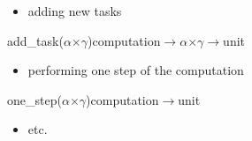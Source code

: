 \documentclass[xcolor=dvipsnames]{beamer}
\begin{document}
\begin{frame}
\medskip\noindent
  \begin{itemize}
  \item adding new tasks
  \end{itemize}
  

\medskip\noindent
{\colorbox{tmpcolor}{\begin{minipage}{\textwidth}\ttfamily\parindent 0pt

\noindent{}\hspace*{1.22ex}add\_{}task\hspace*{1.22ex}(\ensuremath{\alpha}\hspace*{1.22ex}\ensuremath{\times}\hspace*{1.22ex}\ensuremath{\gamma})\hspace*{1.22ex}computation\hspace*{1.22ex}\ensuremath{\rightarrow}\hspace*{1.22ex}\ensuremath{\alpha}\hspace*{1.22ex}\ensuremath{\times}\hspace*{1.22ex}\ensuremath{\gamma}\hspace*{1.22ex}\ensuremath{\rightarrow}\hspace*{1.22ex}unit
\end{minipage}}}


\medskip\noindent
  \begin{itemize}
  \item performing one step of the computation
  \end{itemize}


\medskip\noindent
{\colorbox{tmpcolor}{\begin{minipage}{\textwidth}\ttfamily\parindent 0pt

\noindent{}\hspace*{1.22ex}one\_{}step\hspace*{1.22ex}(\ensuremath{\alpha}\hspace*{1.22ex}\ensuremath{\times}\hspace*{1.22ex}\ensuremath{\gamma})\hspace*{1.22ex}computation\hspace*{1.22ex}\ensuremath{\rightarrow}\hspace*{1.22ex}unit
\end{minipage}}}


\medskip\noindent
\begin{itemize}
\item etc.
\end{itemize}
\end{frame}
\end{document}
